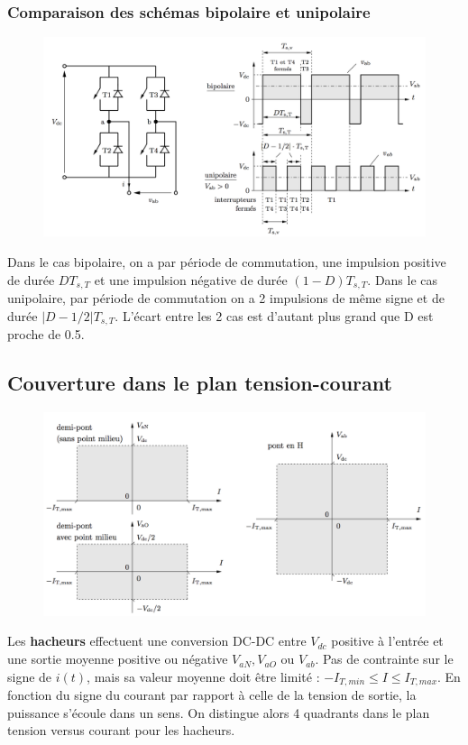 		\subsubsection{Comparaison des schémas bipolaire et unipolaire}
			\begin{figure}
			\vspace{-5mm}
			\includegraphics[scale=0.2]{ch4/12}
			\end{figure}
			Dans le cas bipolaire, on a par période de commutation, une impulsion positive de durée $DT_{s,T}$ et une impulsion négative de durée $(1-D)T_{s,T}$. Dans le cas unipolaire, par période de commutation on a 2 impulsions de même signe et de durée $|D-1/2|T_{s,T}$. L'écart entre les 2 cas est d'autant plus grand que D est proche de 0.5.
			\newpage
			
	\subsection{Couverture dans le plan tension-courant}
		\begin{figure}
		\vspace{-5mm}
		\includegraphics[scale=0.28]{ch4/13}
		\end{figure}
		Les \textbf{hacheurs} effectuent une conversion DC-DC entre $V_{dc}$ positive à l'entrée et une sortie moyenne positive ou négative $V_{aN}, V_{aO}$ ou $V_{ab}$. Pas de contrainte sur le signe de $i(t)$, mais sa valeur moyenne doit être limité : $-I_{T,min}\leq I \leq I_{T,max}$. En fonction du signe du courant par rapport à celle de la tension de sortie, la puissance s'écoule dans un sens. On distingue alors 4 quadrants dans le plan tension versus courant pour les hacheurs. 
		
